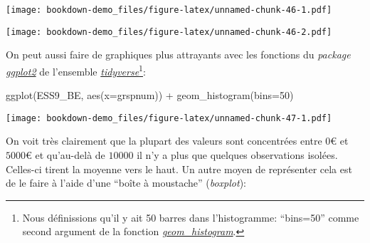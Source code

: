 \documentclass[
]{book}
\newenvironment{Shaded}{\begin{snugshade}}{\end{snugshade}}
\newcommand{\AttributeTok}[1]{\textcolor[rgb]{0.77,0.63,0.00}{#1}}
\newcommand{\DecValTok}[1]{\textcolor[rgb]{0.00,0.00,0.81}{#1}}
\newcommand{\FunctionTok}[1]{\textcolor[rgb]{0.00,0.00,0.00}{#1}}
\newcommand{\NormalTok}[1]{#1}
\newcommand{\SpecialCharTok}[1]{\textcolor[rgb]{0.00,0.00,0.00}{#1}}
\begin{document}
\begin{Shaded}
\end{Shaded}

\texttt{[image: bookdown-demo\_files/figure-latex/unnamed-chunk-46-1.pdf]}

\begin{Shaded}
\end{Shaded}

\texttt{[image: bookdown-demo\_files/figure-latex/unnamed-chunk-46-2.pdf]}

On peut aussi faire de graphiques plus attrayants avec les fonctions du \emph{package} \href{https://ggplot2.tidyverse.org/}{\emph{ggplot2}} de l'ensemble \href{https://www.tidyverse.org/}{\emph{tidyverse}}\footnote{Nous définissions qu'il y ait 50 barres dans l'histogramme: ``bins=50'' comme second argument de la fonction \href{https://ggplot2.tidyverse.org/reference/geom_histogram.html}{\emph{geom\_histogram}}.}:

\begin{Shaded}
\begin{Highlighting}[]
\FunctionTok{ggplot}\NormalTok{(ESS9\_BE, }\FunctionTok{aes}\NormalTok{(}\AttributeTok{x=}\NormalTok{grspnum)) }\SpecialCharTok{+}
  \FunctionTok{geom\_histogram}\NormalTok{(}\AttributeTok{bins=}\DecValTok{50}\NormalTok{)}
\end{Highlighting}
\end{Shaded}

\texttt{[image: bookdown-demo\_files/figure-latex/unnamed-chunk-47-1.pdf]}

On voit très clairement que la plupart des valeurs sont concentrées entre \(0€\) et \(5000€\) et qu'au-delà de \(10000\) il n'y a plus que quelques observations isolées. Celles-ci tirent la moyenne vers le haut. Un autre moyen de représenter cela est de le faire à l'aide d'une ``boîte à moustache'' (\emph{boxplot}):

\begin{Shaded}
\end{Shaded}
\end{document}

